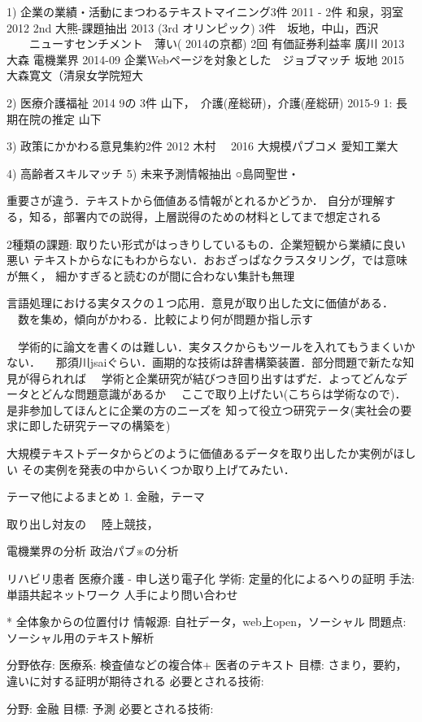 \documentclass[twocolumn]{jarticle}
\begin{document}
1) 企業の業績・活動にまつわるテキストマイニング3件
2011 - 2件  和泉，羽室
2012 2nd 大熊-課題抽出
2013 (3rd オリンピック) 3件　坂地，中山，西沢
　　ニューすセンチメント　薄い( 2014の京都) 2回
   有価証券利益率   廣川
2013 大森 電機業界 
2014-09 企業Webページを対象とした　ジョブマッチ 坂地 
2015 大森寛文（清泉女学院短大

2) 医療介護福祉
2014 9の 3件  山下，　介護(産総研)，介護(産総研)
2015-9  1:  長期在院の推定 山下

3) 政策にかかわる意見集約2件 
 2012 木村　
 2016 大規模パブコメ 愛知工業大

4) 高齢者スキルマッチ
5) 未来予測情報抽出 ○島岡聖世・

重要さが違う．テキストから価値ある情報がとれるかどうか．
自分が理解する，知る，部署内での説得，上層説得のための材料としてまで想定される

2種類の課題: 取りたい形式がはっきりしているもの．企業短観から業績に良い悪い
テキストからなにもわからない．おおざっぱなクラスタリング，では意味が無く，
細かすぎると読むのが間に合わない集計も無理

  言語処理における実タスクの１つ応用．意見が取り出した文に価値がある．
 　数を集め，傾向がかわる．比較により何が問題か指し示す

　学術的に論文を書くのは難しい．実タスクからもツールを入れてもうまくいかない．
　那須川jsaiぐらい．画期的な技術は辞書構築装置．部分問題で新たな知見が得られれば
　学術と企業研究が結びつき回り出すはずだ．よってどんなデータとどんな問題意識があるか
　ここで取り上げたい(こちらは学術なので)．是非参加してほんとに企業の方のニーズを
知って役立つ研究テータ(実社会の要求に即した研究テーマの構築を)

大規模テキストデータからどのように価値あるデータを取り出したか実例がほしい
その実例を発表の中からいくつか取り上げてみたい．

テーマ他によるまとめ
1. 金融，テーマ

取り出し対友の
　陸上競技，

電機業界の分析
政治パブ※の分析

リハビリ患者
医療介護
- 申し送り電子化
学術: 定量的化によるへりの証明
手法: 単語共起ネットワーク
      人手により問い合わせ


* 全体象からの位置付け
  情報源: 自社データ，web上open，ソーシャル
問題点: ソーシャル用のテキスト解析


分野依存: 医療系: 検査値などの複合体+ 医者のテキスト
目標: さまり，要約，違いに対する証明が期待される
必要とされる技術: 

分野: 金融
目標: 予測
必要とされる技術: 
\end{document}
